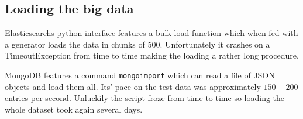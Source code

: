 \subsection{Loading the big data}

Elasticsearchs python interface features a bulk load function which when fed with a generator
loads the data in chunks of 500. Unfortunately it crashes on a TimeoutException from time to 
time making the loading a rather long procedure. 

MongoDB features a command \texttt{mongoimport} which can read a file of JSON objects and load
them all. Its' pace on the test data was approximately $150-200$ entries per second. Unluckily 
the script froze from time to time so loading the whole dataset took again several days.
